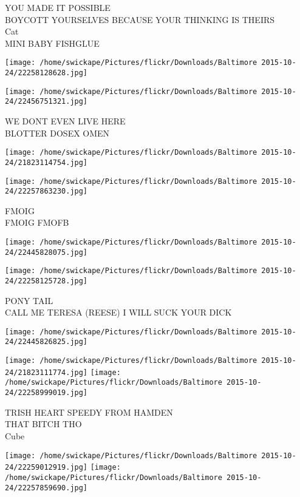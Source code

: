 \documentclass[10pt,letterpaper]{article}
\begin{document}
YOU MADE IT POSSIBLE\\
BOYCOTT YOURSELVES BECAUSE YOUR THINKING IS THEIRS\\
Cat\\
MINI BABY FISHGLUE
\pagebreak

\texttt{[image: /home/swickape/Pictures/flickr/Downloads/Baltimore 2015-10-24/22258128628.jpg]}

\vspace{0.25in}
\texttt{[image: /home/swickape/Pictures/flickr/Downloads/Baltimore 2015-10-24/22456751321.jpg]}

WE DONT EVEN LIVE HERE\\
BLOTTER DOSEX OMEN
\pagebreak

\texttt{[image: /home/swickape/Pictures/flickr/Downloads/Baltimore 2015-10-24/21823114754.jpg]}

\vspace{0.25in}
\texttt{[image: /home/swickape/Pictures/flickr/Downloads/Baltimore 2015-10-24/22257863230.jpg]}

FMOIG\\
FMOIG FMOFB
\pagebreak

\texttt{[image: /home/swickape/Pictures/flickr/Downloads/Baltimore 2015-10-24/22445828075.jpg]}

\vspace{0.25in}
\texttt{[image: /home/swickape/Pictures/flickr/Downloads/Baltimore 2015-10-24/22258125728.jpg]}

PONY TAIL\\
CALL ME TERESA (REESE) I WILL SUCK YOUR DICK
\pagebreak

\texttt{[image: /home/swickape/Pictures/flickr/Downloads/Baltimore 2015-10-24/22445826825.jpg]}

\vspace{0.25in}
\texttt{[image: /home/swickape/Pictures/flickr/Downloads/Baltimore 2015-10-24/21823111774.jpg]}
\texttt{[image: /home/swickape/Pictures/flickr/Downloads/Baltimore 2015-10-24/22258999019.jpg]}

TRISH HEART SPEEDY FROM HAMDEN\\
THAT BITCH THO\\
Cube
\pagebreak

\texttt{[image: /home/swickape/Pictures/flickr/Downloads/Baltimore 2015-10-24/22259012919.jpg]}
\texttt{[image: /home/swickape/Pictures/flickr/Downloads/Baltimore 2015-10-24/22257859690.jpg]}
\end{document}

